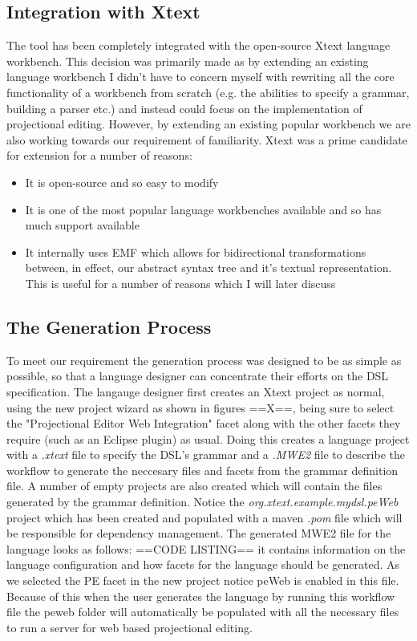 \documentclass{report}
\begin{document}
\subsection{Integration with Xtext}\label{integrationWithXtext}
The tool has been completely integrated with the open-source Xtext language workbench. This decision was primarily made as by extending an existing language workbench I didn't have to concern myself with rewriting all the core functionality of a workbench from scratch (e.g. the abilities to specify a grammar, building a parser etc.) and instead could focus on the implementation of projectional editing. However, by extending an existing popular workbench we are also working towards our \RFamiliarity requirement of familiarity.
 Xtext was a prime candidate for extension for a number of reasons:
\begin{itemize}
\item{It is open-source and so easy to modify}
\item{It is one of the most popular language workbenches available and so has much support available}
\item{It internally uses EMF which allows for bidirectional transformations between, in effect, our abstract syntax tree and it's textual representation. This is useful for a number of reasons which I will later discuss}
\end{itemize}

\subsection{The Generation Process}
To meet our \RSetup requirement the generation process was designed to be as simple as possible, so that a language designer can concentrate their efforts on the DSL specification. The langauge designer first creates an Xtext project as normal, using the new project wizard as shown in figures ==X==, being sure to select the "Projectional Editor Web Integration" facet along with the other facets they require (such as an Eclipse plugin) as usual.
Doing this creates a language project with a \emph{.xtext} file to specify the DSL's grammar and a \emph{.MWE2} file to describe the workflow to generate the neccesary files and facets from the grammar definition file. A number of empty projects are also created which will contain the files generated by the grammar definition. Notice the \emph{org.xtext.example.mydsl.peWeb} project which has been created and populated with a maven \emph{.pom} file which will be responsible for dependency management.
The generated MWE2 file for the language looks as follows:
==CODE LISTING==
it contains information on the language configuration and how facets for the language should be generated. As we selected the PE facet in the new project notice peWeb is enabled in this file. Because of this when the user generates the language by running this workflow file the peweb folder will automatically be populated with all the necessary files to run a server for web based projectional editing.
\end{document}
